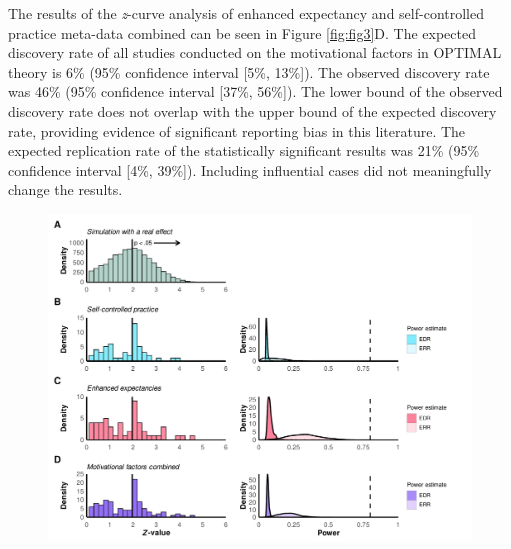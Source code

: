 \documentclass[
  doc, donotrepeattitle,floatsintext]{apa7}
\begin{document}
The results of the \emph{z}-curve analysis of enhanced expectancy and self-controlled practice meta-data combined can be seen in Figure \ref{fig:fig3}D. The expected discovery rate of all studies conducted on the motivational factors in OPTIMAL theory is 6\% (95\% confidence interval {[}5\%, 13\%{]}). The observed discovery rate was 46\% (95\% confidence interval {[}37\%, 56\%{]}). The lower bound of the observed discovery rate does not overlap with the upper bound of the expected discovery rate, providing evidence of significant reporting bias in this literature. The expected replication rate of the statistically significant results was 21\% (95\% confidence interval {[}4\%, 39\%{]}). Including influential cases did not meaningfully change the results.

\clearpage

\begin{figure}

{\centering \includegraphics{../../figs/fig3} 

}


\end{figure}
\end{document}
